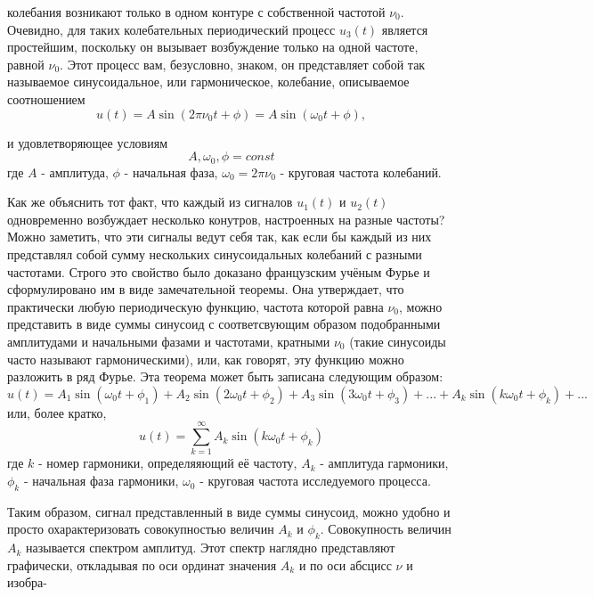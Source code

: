 \documentclass[12pt,onecolumn]{article}
\date{}
\begin{document}
\maketitle
колебания возникают только в одном контуре с собственной частотой $\nu_0$. Очевидно, для таких колебательных периодический процесс $u_3(t)$ является простейшим, поскольку он вызывает возбуждение только на одной частоте, равной $\nu_0$. Этот процесс вам, безусловно, знаком, он представляет собой так называемое синусоидальное, или гармоническое, колебание, описываемое соотношением \[u(t) = A\sin({2\pi\nu_0t + \phi}) = A\sin({\omega_0t + \phi}),\]  

и удовлетворяющее условиям \[ A, \omega_0, \phi = const \] где $A$ - амплитуда, $\phi$ - начальная фаза, $\omega_0 = 2\pi\nu_0$ - круговая частота колебаний. \par Как же объяснить тот факт, что каждый из сигналов $u_1(t)$ и $u_2(t)$ одновременно возбуждает несколько конутров, настроенных на разные частоты? Можно заметить, что эти  сигналы ведут себя так, как если бы каждый из них представлял собой сумму нескольких синусоидальных колебаний с разными частотами. Строго это свойство было доказано французским учёным Фурье и сформулировано им в виде замечательной теоремы. Она утверждает, что практически любую периодическую функцию, частота которой равна $\nu_0$, можно представить в виде суммы синусоид с соответсвующим образом подобранными амплитудами и начальными фазами и частотами, кратными $\nu_0$ (такие синусоиды часто называют гармоническими), или, как говорят, эту функцию можно разложить в ряд Фурье. Эта теорема может быть записана следующим образом: \[ u(t) = A_1\sin({\omega_0t + \phi_1})  + A_2\sin({2\omega_0t + \phi_2}) +  A_3\sin({3\omega_0t + \phi_3}) + ... + A_k\sin({k\omega_0t + \phi_k}) + ...\] или, более кратко, \[u(t) = \sum_{k=1}^{\infty}A_k\sin({k\omega_0t + \phi_k})\] где $k$ - номер гармоники, определяяющий её частоту, $A_k$ - амплитуда гармоники, $\phi_k$ - начальная фаза гармоники, $\omega_0$ - круговая частота исследуемого процесса. \par Таким образом, сигнал представленный в виде суммы синусоид, можно удобно и просто охарактеризовать совокупностью величин $A_k$ и $\phi_k$. Совокупность величин $A_k$ называется спектром амплитуд. Этот спектр наглядно представляют графически, откладывая по оси ординат значения $A_k$ и по оси абсцисс $\nu$ и изобра-
\end{document}
